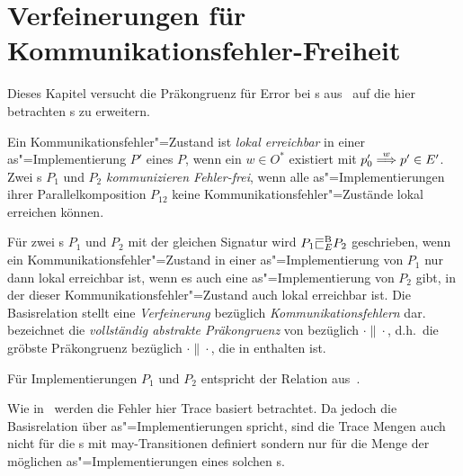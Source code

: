 \chapter{Verfeinerungen für Kommunikationsfehler-Freiheit}

Dieses Kapitel versucht die Präkongruenz für Error bei \EIO{}s
aus~\cite{Schinko2016BA} auf die hier betrachten \MEIO{}s zu erweitern.

\begin{Def}
  Ein Kommunikationsfehler"=Zustand ist \emph{lokal erreichbar} in einer
  as"=Implementierung $P'$ eines \MEIO{} $P$, wenn ein $w\in O^*$ existiert mit
  $p'_0 \weakmust[w]p'\in E'$.\\
  Zwei \MEIO{}s $P_1$ und $P_2$ \emph{kommunizieren Fehler-frei}, wenn alle
  as"=Implementierungen ihrer Parallelkomposition $P_{12}$ keine
  Kommunikationsfehler"=Zustände lokal erreichen können.
\end{Def}

\begin{Def}
  Für zwei \MEIO{}s $P_1$ und $P_2$ mit der gleichen Signatur wird $P_1\EBRel{} P_2$
  geschrieben, wenn ein Kommunikationsfehler"=Zustand in einer as"=Implementierung
  von $P_1$ nur dann lokal erreichbar ist, wenn es auch eine as"=Implementierung
  von $P_2$ gibt, in der dieser Kommunikationsfehler"=Zustand auch lokal
  erreichbar ist. Die Basisrelation stellt eine \emph{Verfeinerung} bezüglich
  \emph{Kommunikationsfehlern} dar.\\
  \ECRel{} bezeichnet die \emph{vollständig abstrakte Präkongruenz} von
  \EBRel{} bezüglich $\cdot\|\cdot$, d.h.\ die gröbste Präkongruenz bezüglich
  $\cdot\|\cdot$, die in \EBRel{} enthalten ist.
\end{Def}

Für Implementierungen $P_1$ und $P_2$ entspricht \EBRel{} der Relation
\EBbaRel{} aus~\cite{Schinko2016BA}.

Wie in~\cite{Schinko2016BA} werden die Fehler hier Trace basiert betrachtet. Da
jedoch die Basisrelation über as"=Implementierungen spricht, sind die Trace Mengen
auch nicht für die \MEIO{}s mit may-Transitionen definiert sondern nur für die
Menge der möglichen as"=Implementierungen eines solchen \MEIO{}s.

